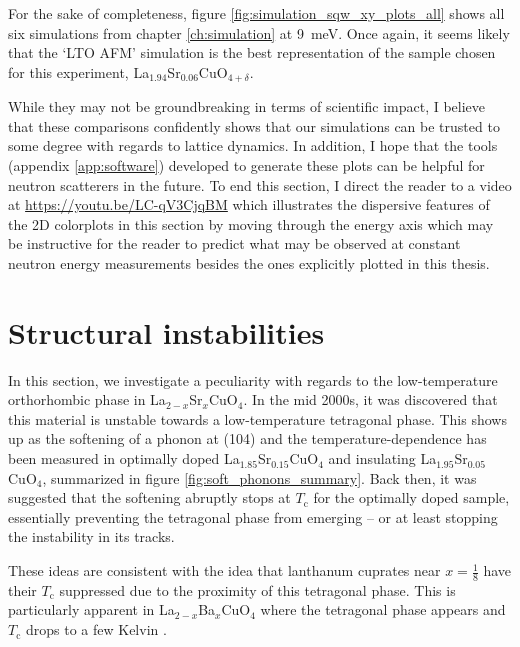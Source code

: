 For the sake of completeness, figure \ref{fig:simulation_sqw_xy_plots_all} shows all six simulations from chapter \ref{ch:simulation} at \SI{9}{\milli\eV}. Once again, it seems likely that the `LTO AFM' simulation is the best representation of the sample chosen for this experiment, La$_{1.94}$Sr$_{0.06}$CuO$_{4+\delta}$.

While they may not be groundbreaking in terms of scientific impact, I believe that these comparisons confidently shows that our simulations can be trusted to some degree with regards to lattice dynamics. In addition, I hope that the tools (appendix \ref{app:software}) developed to generate these plots can be helpful for neutron scatterers in the future. To end this section, I direct the reader to a video at \url{https://youtu.be/LC-qV3CjqBM} which illustrates the dispersive features of the 2D colorplots in this section by moving through the energy axis which may be instructive for the reader to predict what may be observed at constant neutron energy measurements besides the ones explicitly plotted in this thesis.

\section{Structural instabilities}\label{sec:structural_instabilities}
In this section, we investigate a peculiarity with regards to the low-temperature orthorhombic phase in La$_{2-x}$Sr$_x$CuO$_{4}$. In the mid 2000s, it was discovered that this material is unstable towards a low-temperature tetragonal phase. This shows up as the softening of a phonon at (104) and the temperature-dependence has been measured in optimally doped La$_{1.85}$Sr$_{0.15}$CuO$_4$ and insulating La$_{1.95}$Sr$_{0.05}$CuO$_4$, summarized in figure \ref{fig:soft_phonons_summary}. Back then, it was suggested that the softening abruptly stops at $T_\text{c}$ for the optimally doped sample, essentially preventing the tetragonal phase from emerging -- or at least stopping the instability in its tracks.

These ideas are consistent with the idea that lanthanum cuprates near $x=\frac{1}{8}$ have their $T_\text{c}$ suppressed due to the proximity of this tetragonal phase. This is particularly apparent in La$_{2-x}$Ba$_x$CuO$_4$ where the tetragonal phase appears and $T_\text{c}$ drops to a few Kelvin \cite{Hucker2012}.

